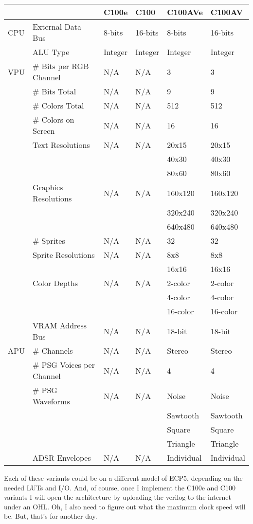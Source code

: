 \documentclass[letterpaper,12pt]{book}
\begin{document}
\begin{tabular}{|l|l|l|l|l|l|}
\hline
	 &  & C100e & C100 & C100AVe & C100AV\\
\hline
	CPU & External Data Bus & 8-bits & 16-bits & 8-bits & 16-bits\\
	 & ALU Type & Integer & Integer & Integer & Integer\\
\hline
	VPU & \# Bits per RGB Channel & N/A & N/A & 3 & 3\\
	 & \# Bits Total & N/A & N/A & 9 & 9\\
	 & \# Colors Total & N/A & N/A & 512 & 512\\
	 & \# Colors on Screen & N/A & N/A & 16 & 16\\
	 & Text Resolutions & N/A & N/A & 20x15 & 20x15\\
	 & & & & 40x30 & 40x30\\
	 & & & & 80x60 & 80x60\\
	 & Graphics Resolutions & N/A & N/A & 160x120 & 160x120\\
	 & & & & 320x240 & 320x240\\
	 & & & & 640x480 & 640x480\\
	 & \# Sprites & N/A & N/A & 32 & 32\\
	 & Sprite Resolutions & N/A & N/A & 8x8 & 8x8\\
	 & & & & 16x16 & 16x16\\
	 & Color Depths & N/A & N/A & 2-color & 2-color\\
	 & & & & 4-color & 4-color\\
	 & & & & 16-color & 16-color\\
	 & VRAM Address Bus & N/A & N/A & 18-bit & 18-bit\\
\hline
	APU & \# Channels & N/A & N/A & Stereo & Stereo\\
	 & \# PSG Voices per Channel & N/A & N/A & 4 & 4\\
	 & \# PSG Waveforms & N/A & N/A & Noise & Noise\\
	 & & & & Sawtooth & Sawtooth\\
	 & & & & Square & Square\\
	 & & & & Triangle & Triangle\\
	 & ADSR Envelopes & N/A & N/A & Individual & Individual\\
\hline
\end{tabular}

Each of these variants could be on a different model of ECP5, depending on the needed LUTs and I/O. And, of course, once I implement the C100e and C100 variants I will open the architecture by uploading the verilog to the internet under an OHL. Oh, I also need to figure out what the maximum clock speed will be. But, that's for another day.
\end{document}
